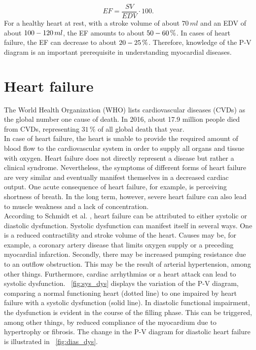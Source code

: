 \begin{equation}
  EF = \frac{SV}{EDV} \cdot 100.
 \label{eq:EF}
\end{equation}
For a healthy heart at rest, with a stroke volume of about $70 \, ml$ and an EDV of about $100\--120 \, ml$, the EF amounts to about $50\--60\, \%$. In cases of heart failure, the EF can decrease to about $20\--25 \, \%$. Therefore, knowledge of the P-V diagram is an important prerequisite in understanding myocardial diseases. \cite{HKS4}

\section{Heart failure}
The World Health Organization (WHO) lists cardiovascular diseases (CVDs) as the global number one cause of death. In 2016, about 17.9 million people died from CVDs, representing $31 \,\%$ of all global death that year. \cite{WHO}
\\In case of heart failure, the heart is unable to provide the required amount of blood flow to the cardiovascular system in order to supply all organs and tissue with oxygen.
Heart failure does not directly represent a disease but rather a clinical syndrome. Nevertheless, the symptoms of different forms of heart failure are very similar and eventually manifest themselves in a decreased cardiac output. One acute consequence of heart failure, for example, is perceiving shortness of breath. In the long term, however, severe heart failure can also lead to muscle weakness and a lack of concentration.
\\According to Schmidt et al. \cite{HKS4}, heart failure can be attributed to either systolic or diastolic dysfunction. Systolic dysfunction can manifest itself in several ways. One is a reduced contractility and stroke volume of the heart. Causes may be, for example, a coronary artery disease that limits oxygen supply or a preceding myocardial infarction. Secondly, there may be increased pumping resistance due to an outflow obstruction.  This may be the result of arterial hypertension, among other things. Furthermore, cardiac arrhythmias or a heart attack can lead to systolic dysfunction. \figurename~\ref{fig:sys_dys} displays the variation of the P-V diagram, comparing a normal functioning heart (dotted line) to one impaired by heart failure with a systolic dysfunction (solid line). In diastolic functional impairment, the dysfunction is evident in the course of the filling phase. This can be triggered, among other things, by reduced compliance of the myocardium due to hypertrophy or fibrosis. The change in the P-V diagram for diastolic heart failure is illustrated in \figurename~\ref{fig:dias_dys}.
